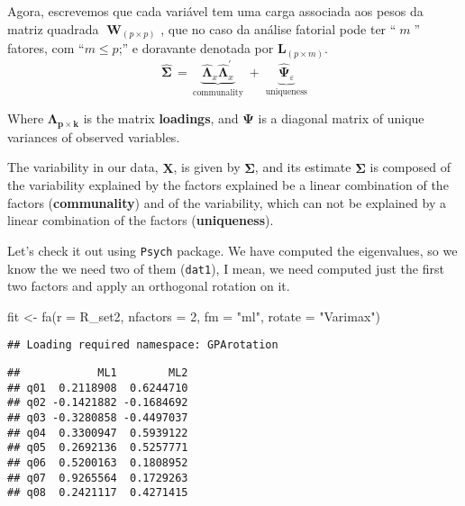 \documentclass[
]{article}
\newenvironment{Shaded}{\begin{snugshade}}{\end{snugshade}}
\newcommand{\AttributeTok}[1]{\textcolor[rgb]{0.77,0.63,0.00}{#1}}
\newcommand{\DecValTok}[1]{\textcolor[rgb]{0.00,0.00,0.81}{#1}}
\newcommand{\FunctionTok}[1]{\textcolor[rgb]{0.00,0.00,0.00}{#1}}
\newcommand{\NormalTok}[1]{#1}
\newcommand{\OtherTok}[1]{\textcolor[rgb]{0.56,0.35,0.01}{#1}}
\newcommand{\SpecialCharTok}[1]{\textcolor[rgb]{0.00,0.00,0.00}{#1}}
\newcommand{\StringTok}[1]{\textcolor[rgb]{0.31,0.60,0.02}{#1}}
\begin{document}
Agora, escrevemos que cada variável tem uma carga associada aos pesos da
matriz quadrada \(\;\mathbf{W}_{(p \times p)}\) , que no caso da análise
fatorial pode ter ``\(\;m\;\)'' fatores, com ``\(m \leq p\);'' e
doravante denotada por \(\mathbf{L}_{(p \times m)}\). \[
\hat{\mathbf{\Sigma}}\,=\, \underbrace{\hat{\mathbf{\Lambda}}_{x}  \hat{\mathbf{\Lambda}}^{\prime}_{x}}_{\text{communality}} \; + \; \underbrace{\hat{\mathbf{\Psi}}_{\varepsilon}}_{\text{uniqueness}}
\]

Where \(\mathbf{\Lambda_{p \times k}}\) is the matrix \textbf{loadings},
and \(\mathbf{\Psi}\) is a diagonal matrix of unique variances of
observed variables.

The variability in our data, \(\mathbf{X}\), is given by
\(\mathbf{\Sigma}\), and its estimate \(\mathbf{\hat{\Sigma}}\) is
composed of the variability explained by the factors explained be a
linear combination of the factors (\textbf{communality}) and of the
variability, which can not be explained by a linear combination of the
factors (\textbf{uniqueness}).

Let's check it out using \texttt{Psych} package. We have computed the
eigenvalues, so we know the we need two of them (\texttt{dat1}), I mean,
we need computed just the first two factors and apply an orthogonal
rotation on it.

\begin{Shaded}
\begin{Highlighting}[]
\NormalTok{fit }\OtherTok{\textless{}{-}} \FunctionTok{fa}\NormalTok{(}\AttributeTok{r =}\NormalTok{ R\_set2, }\AttributeTok{nfactors =} \DecValTok{2}\NormalTok{, }\AttributeTok{fm =} \StringTok{"ml"}\NormalTok{, }\AttributeTok{rotate =} \StringTok{"Varimax"}\NormalTok{)}
\end{Highlighting}
\end{Shaded}

\begin{verbatim}
## Loading required namespace: GPArotation
\end{verbatim}

\begin{Shaded}
\end{Shaded}

\begin{verbatim}
##            ML1        ML2
## q01  0.2118908  0.6244710
## q02 -0.1421882 -0.1684692
## q03 -0.3280858 -0.4497037
## q04  0.3300947  0.5939122
## q05  0.2692136  0.5257771
## q06  0.5200163  0.1808952
## q07  0.9265564  0.1729263
## q08  0.2421117  0.4271415
\end{verbatim}
\end{document}

